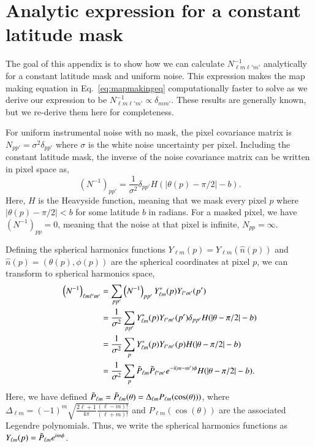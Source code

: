 \documentclass[twocolumn]{../common/aa}
\begin{document}


\appendix

\section{Analytic expression for a constant latitude mask}
\label{sec:appendixA}


The goal of this appendix is to show how we can calculate $N_{\ell m \ell' m'}^{-1}$ analytically for a constant latitude mask and uniform noise. This expression makes the map making equation in Eq.~\eqref{eq:mapmakingeq} computationally faster to solve as we derive our expression to be $N_{\ell m \ell' m'}^{-1} \propto \delta_{mm'}$. These results are generally known, but we re-derive them here for completeness.

For uniform instrumental noise with no mask, the pixel covariance matrix is $N_{pp'} = \sigma^2 \delta_{pp'}$ where $\sigma$ is the white noise uncertainty per pixel. Including the constant latitude mask, the inverse of the noise covariance matrix can be written in pixel space as,
$$
\left(N^{-1} \right)_{pp'} = \frac{1}{\sigma^2} \delta_{pp'} H(|\theta(p) -\pi/2|-b).
$$
Here, $H$ is the Heavyside function, meaning that we mask every pixel $p$ where $|\theta(p) -\pi/2| < b$ for some latitude $b$ in radians. For a masked pixel, we have $\left(N^{-1} \right)_{pp}=0$, meaning that the noise at that pixel is infinite, $N_{pp} = \infty$.

Defining the spherical harmonics functions $Y_{\ell m}\left(p\right) = Y_{\ell m}\left(\hat{n}(p)\right)$ and $\hat{n}(p) = (\theta(p), \phi(p))$ are the spherical coordinates at pixel $p$, we can transform to spherical harmonics space,
\begin{align}
\nonumber
\left(N^{-1}\right)_{\ell m \ell' m'} &= \sum_{p p'}\left(N^{-1}\right)_{pp'}Y^{*}_{\ell m}(p)Y_{\ell' m'}(p')\\
\nonumber
&= \frac{1}{\sigma^2}\sum_{p p'} Y^{*}_{\ell m}(p)Y_{\ell' m'}(p') \delta_{pp'} H(|\theta -\pi/2|-b)\\
\nonumber
&= \frac{1}{\sigma^2}\sum_{p } Y^{*}_{\ell m}(p)Y_{\ell' m'}(p) H(|\theta -\pi/2|-b)\\
&= \frac{1}{\sigma^2}\sum_p \Tilde{P}_{\ell m}\Tilde{P}_{\ell' m'} e^{-i(m-m')\phi} H(|\theta -\pi/2|-b).
\end{align}
Here, we have defined $\Tilde{P}_{\ell m}=\Tilde{P}_{\ell m}(\theta) = \Delta_{\ell m}P_{\ell m}(\cos(\theta)))$, where ${\Delta_{\ell m}=(-1)^m \sqrt{\frac{2\ell+1}{4\pi}\frac{(\ell - m)!}{(\ell+m)!}}}$ and $P_{\ell m}(\cos(\theta))$ are the associated Legendre polynomials. Thus, we write the spherical harmonics functions as $Y_{\ell m}(p) = \Tilde{P}_{\ell m} e^{im\phi}$.
\end{document}
